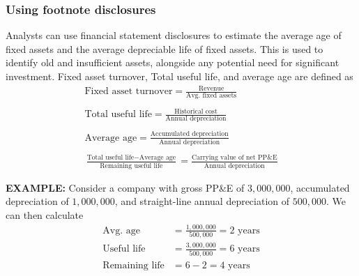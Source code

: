 \documentclass[../notes_compiled.tex]{subfiles}
\begin{document}
\subsubsection{Using footnote disclosures}
\begin{itemize}
\item Analysts can use financial statement disclosures to estimate the average age of fixed assets and the average depreciable life of fixed assets. This is used to identify old and insufficient assets, alongside any potential need for significant investment. Fixed asset turnover, Total useful life, and average age are defined as
\begin{gather}
\text{Fixed asset turnover} = \frac{\text{Revenue}}{\text{Avg. fixed assets}} \\ \nonumber \\
\text{Total useful life} = \frac{\text{Historical cost}}{\text{Annual depreciation}} \\\nonumber \\
\text{Average age} = \frac{\text{Accumulated depreciation}}{\text{Annual depreciation}} \\ \nonumber \\
\frac{\text{Total useful life} - \text{Average age}}{\text{Remaining useful life}} = \frac{\text{Carrying value of net PP\&E}}{\text{Annual depreciation}}
\end{gather}

{\color{RedViolet}
\item[] \textbf{EXAMPLE:} Consider a company with gross PP\&E of $3,000,000$, accumulated depreciation of $1,000,000$, and straight-line annual depreciation of $500,000$. We can then calculate
\begin{align*}
\text{Avg. age} &= \frac{1,000,000}{500,000} = \text{2 years} \\
\text{Useful life} &= \frac{3,000,000}{500,000} = \text{6 years} \\
\text{Remaining life} &= 6-2 = \text{4 years}
\end{align*}
}

\end{itemize}
\end{document}
